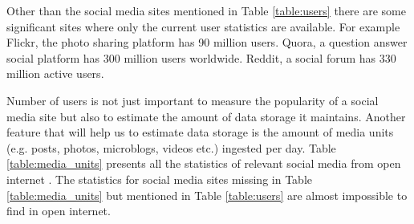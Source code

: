 \begin{table}[t]
{
}
    \label{table:users}
\end{table}

Other than the social media sites mentioned in Table \ref{table:users} there are some significant sites where only the current user statistics are available. For example Flickr, the photo sharing platform has 90 million users. Quora, a question answer social platform has 300 million users worldwide. Reddit, a social forum has 330 million active users.

Number of users is not just important to measure the popularity of a social media site but also to estimate the amount of data storage it maintains. Another feature that will help us to estimate data storage is the amount of media units (e.g. posts, photos, microblogs, videos etc.) ingested per day. Table \ref{table:media_units} presents all the statistics of relevant social media from open internet \cite{zephoria, domo, statista, expandedramblings}. The statistics for social media sites missing in Table \ref{table:media_units} but mentioned in Table \ref{table:users} are almost impossible to find in open internet.



